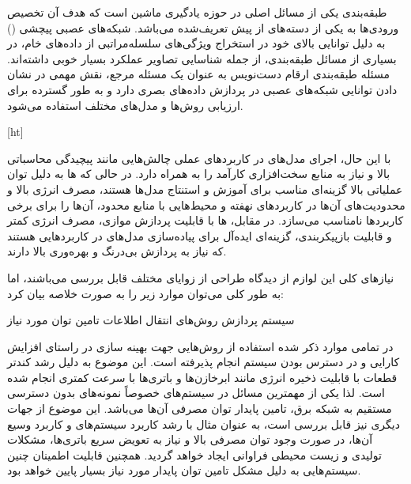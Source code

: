 
\label{فصل۱:مقدمه}


طبقه‌بندی یکی از مسائل اصلی در حوزه یادگیری ماشین است که هدف آن تخصیص ورودی‌ها به یکی از دسته‌های از پیش تعریف‌شده می‌باشد. شبکه‌های عصبی پیچشی () به دلیل توانایی بالای خود در استخراج ویژگی‌های سلسله‌مراتبی از داده‌های خام، در بسیاری از مسائل طبقه‌بندی، از جمله شناسایی تصاویر عملکرد بسیار خوبی داشته‌اند. مسئله طبقه‌بندی ارقام دست‌نویس به عنوان یک مسئله مرجع، نقش مهمی در نشان دادن توانایی شبکه‌های عصبی در پردازش داده‌های بصری دارد و به طور گسترده برای ارزیابی روش‌ها و مدل‌های مختلف استفاده می‌شود.

[ht]

با این حال، اجرای مدل‌های  در کاربردهای عملی چالش‌هایی مانند پیچیدگی محاسباتی بالا و نیاز به منابع سخت‌افزاری کارآمد را به همراه دارد. در حالی که ها به دلیل توان عملیاتی بالا گزینه‌ای مناسب برای آموزش و استنتاج مدل‌ها هستند، مصرف انرژی بالا و محدودیت‌های آن‌ها در کاربردهای نهفته و محیط‌هایی با منابع محدود، آن‌ها را برای برخی کاربردها نامناسب می‌سازد. در مقابل، ‌ها با قابلیت پردازش موازی، مصرف انرژی کمتر و قابلیت بازپیکربندی، گزینه‌ای ایده‌آل برای پیاده‌سازی مدل‌های  در کاربردهایی هستند که نیاز به پردازش بی‌درنگ و بهره‌وری بالا دارند.





نیازهای کلی این لوازم از دیدگاه طراحی از زوایای مختلف قابل بررسی می‌باشند، اما به طور کلی می‌توان موارد زیر را به صورت خلاصه بیان کرد:


 سیستم پردازش
 روش‌های انتقال اطلاعات
 تامین توان مورد نیاز



در تمامی موارد ذکر شده استفاده از روش‌هایی جهت بهینه سازی در راستای افزایش کارایی و در دسترس بودن سیستم انجام پذیرفته است. این موضوع به دلیل رشد کندتر قطعات با قابلیت ذخیره انرژی مانند ابرخازن‌ها و باتری‌ها با سرعت کمتری انجام شده است. لذا یکی از مهمترین مسائل در سیستم‌های  خصوصاً نمونه‌های بدون دسترسی مستقیم به شبکه برق، تامین پایدار توان مصرفی آن‌ها می‌باشد. این موضوع از جهات دیگری نیز قابل بررسی است، به عنوان مثال با رشد کاربرد سیستم‌های  و کاربرد وسیع آن‌ها، در صورت وجود توان مصرفی بالا و نیاز به تعویض سریع باتری‌ها، مشکلات تولیدی و زیست محیطی فراوانی ایجاد خواهد گردید. همچنین قابلیت اطمینان چنین سیستم‌هایی به دلیل مشکل تامین توان پایدار مورد نیاز بسیار پایین خواهد بود.



